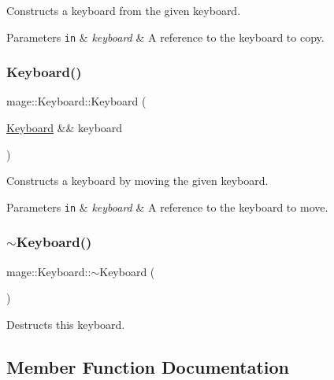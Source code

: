 Constructs a keyboard from the given keyboard.


\begin{DoxyParams}[1]{Parameters}
\mbox{\tt in}  & {\em keyboard} & A reference to the keyboard to copy. \\
\hline
\end{DoxyParams}
\hypertarget{classmage_1_1_keyboard_aaa8f4c85cdc09b4f86169aad23d2c619}{}\label{classmage_1_1_keyboard_aaa8f4c85cdc09b4f86169aad23d2c619} 
\subsubsection{\texorpdfstring{Keyboard()}{Keyboard()}\hspace{0.1cm}{\footnotesize\ttfamily [3/3]}}
{\footnotesize\ttfamily mage\+::\+Keyboard\+::\+Keyboard (\begin{DoxyParamCaption}\item[{\hyperlink{classmage_1_1_keyboard}{Keyboard} \&\&}]{keyboard }\end{DoxyParamCaption})\hspace{0.3cm}{\ttfamily [default]}}

Constructs a keyboard by moving the given keyboard.


\begin{DoxyParams}[1]{Parameters}
\mbox{\tt in}  & {\em keyboard} & A reference to the keyboard to move. \\
\hline
\end{DoxyParams}
\hypertarget{classmage_1_1_keyboard_a80a84ec68749fac71690fb45287d446a}{}\label{classmage_1_1_keyboard_a80a84ec68749fac71690fb45287d446a} 
\subsubsection{\texorpdfstring{$\sim$\+Keyboard()}{~Keyboard()}}
{\footnotesize\ttfamily mage\+::\+Keyboard\+::$\sim$\+Keyboard (\begin{DoxyParamCaption}{ }\end{DoxyParamCaption})\hspace{0.3cm}{\ttfamily [default]}}

Destructs this keyboard. 

\subsection{Member Function Documentation}
\hypertarget{classmage_1_1_keyboard_a696032d3a0d9bcf1a677a35e1e3d9aa8}{}\label{classmage_1_1_keyboard_a696032d3a0d9bcf1a677a35e1e3d9aa8} 
